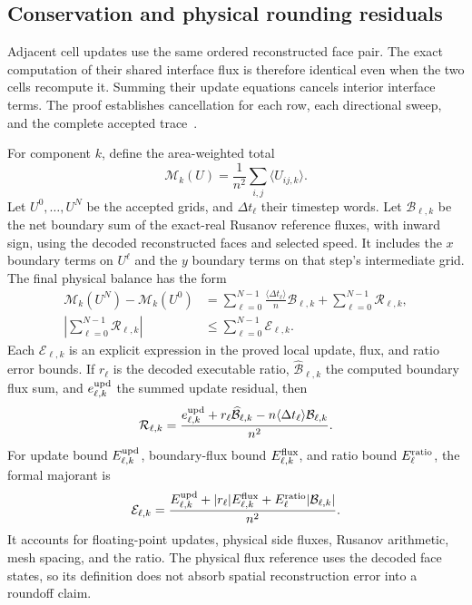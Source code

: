 \documentclass[11pt]{article}
\newcommand{\val}[1]{\langle #1\rangle}
\begin{document}
\subsection{Conservation and physical rounding residuals}

Adjacent cell updates use the same ordered reconstructed face pair.  The exact computation of their shared interface flux is therefore identical even when the two cells recompute it.  Summing their update equations cancels interior interface terms.  The proof establishes cancellation for each row, each directional sweep, and the complete accepted trace~\cite{balance}.

For component $k$, define the area-weighted total
\begin{equation}
\mathcal M_k(U)=\frac1{n^2}\sum_{i,j}\val{U_{ij,k}}.
\end{equation}
Let $U^0,\ldots,U^N$ be the accepted grids, and $\Delta t_\ell$ their timestep words.  Let $\mathcal B_{\ell,k}$ be the net boundary sum of the exact-real Rusanov reference fluxes, with inward sign, using the decoded reconstructed faces and selected speed.  It includes the $x$ boundary terms on $U^\ell$ and the $y$ boundary terms on that step's intermediate grid.  The final physical balance has the form
\begin{align}
\mathcal M_k(U^N)-\mathcal M_k(U^0)
&=\sum_{\ell=0}^{N-1}\frac{\val{\Delta t_\ell}}n\mathcal B_{\ell,k}
  +\sum_{\ell=0}^{N-1}\mathcal R_{\ell,k},\label{eq:balance}\\
\left|\sum_{\ell=0}^{N-1}\mathcal R_{\ell,k}\right|
&\leq\sum_{\ell=0}^{N-1}\mathcal E_{\ell,k}.\label{eq:balancebound}
\end{align}
Each $\mathcal E_{\ell,k}$ is an explicit expression in the proved local update, flux, and ratio error bounds.  If $r_\ell$ is the decoded executable ratio, $\widehat{\mathcal B}_{\ell,k}$ the computed boundary flux sum, and $e^{\rm upd}_{\ell,k}$ the summed update residual, then
\begin{equation}
\mathcal R_{\ell,k}=\frac{e^{\rm upd}_{\ell,k}
  +r_\ell\widehat{\mathcal B}_{\ell,k}
  -n\val{\Delta t_\ell}\mathcal B_{\ell,k}}{n^2}.
\end{equation}
For update bound $E^{\rm upd}_{\ell,k}$, boundary-flux bound $E^{\rm flux}_{\ell,k}$, and ratio bound $E^{\rm ratio}_\ell$, the formal majorant is
\begin{equation}
\mathcal E_{\ell,k}=\frac{E^{\rm upd}_{\ell,k}
  +|r_\ell|E^{\rm flux}_{\ell,k}
  +E^{\rm ratio}_\ell|\mathcal B_{\ell,k}|}{n^2}.
\end{equation}
It accounts for floating-point updates, physical side fluxes, Rusanov arithmetic, mesh spacing, and the ratio.  The physical flux reference uses the decoded face states, so its definition does not absorb spatial reconstruction error into a roundoff claim.
\end{document}
